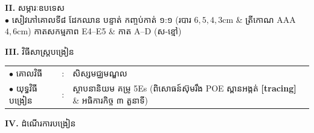\documentclass[a4paper,10pt]{article}
\begin{document}
{\vspace{0pt}

\textbf{II.} {\muol សម្ភារៈឧបទេស}\\[1pt]
\hspace*{0.55cm}$\bullet$ \hspace{0.35cm} សៀវភៅគោលទី៨ ដែកឈាន បន្ទាត់ កញ្ចប់កាត់ ១:១ (របារ $6,5,4,3\text{cm}$ \& ត្រីកោណ AAA $4,6\text{cm}$) កាតសកម្មភាព E4--E5 \& កាត A--D (ស-ខ្មៅ)

\vspace{0pt}

\textbf{III.} {\muol វិធីសាស្រ្តបង្រៀន}\\[1pt]
\hspace*{0.55cm}%
\begin{tabular}{@{}l l l@{}}
  $\bullet$ \hspace{0.35cm} គោលវិធី & : \hspace{0.7cm} & សិស្សមជ្ឈមណ្ឌល \\
  $\bullet$ \hspace{0.35cm} យុទ្ធវិធីបង្រៀន & : & ស្ថាបនានិយម គម្រូ 5Es (ពិសោធន៍ស៊ុមរឹង POE ស្ពានអង្កត់ \textbf{[tracing]} \& អធិការកិច្ច ៣ តួនាទី) \\
\end{tabular}
}

\vspace{0pt}

\textbf{IV.} {\muol ដំណើរការបង្រៀន}

\vspace{0pt}
\end{document}
